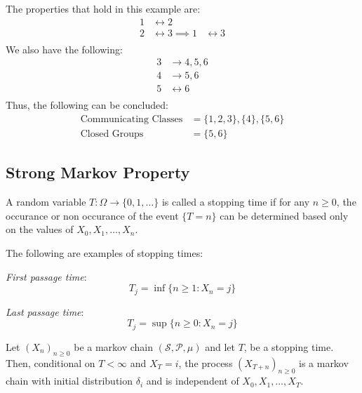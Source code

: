 \begin{example}
    The properties that hold in this example are:
    \[
        \begin{aligned}
             1 & \leftrightarrow 2 \\
             2 & \leftrightarrow 3 \implies 1 & \leftrightarrow 3 \\
        \end{aligned}
    \]
    We also have the following:
    \[
        \begin{aligned}
            3 & \to  4,5,6 \\
            4 & \to  5,6 \\
            5 & \leftrightarrow 6 \\
        \end{aligned}  
    \]
    Thus, the following can be concluded:
    \[
        \begin{aligned}
        \text{Communicating Classes} &= \{1,2,3\}, \{4\}, \{5,6\}\\
        \text{Closed Groups} &=  \{5,6\}
        \end{aligned}
    \]
\end{example}

\subsection{Strong Markov Property}
\begin{definition}
    A random variable \(T : \Omega \rightarrow \{0,1,\dots \} \) is called a stopping time if for any \(n \geq 0\),
    the occurance or non occurance of the event \(\{T = n\}\) can be determined based only on
     the values of \(X_0, X_1, \dots , X_n\).  
\end{definition}
\begin{example} The following are examples of stopping times:
    \item \emph{First passage time}:
    \[
        T_j = \inf \{n \geq 1 : X_n = j\}
    \]
    \item \emph{Last passage time}:
    \[
        T_j = \sup \{n \geq 0 : X_n = j\}
    \]
\end{example}
\begin{definition}
    Let \((X_n)_{n \geq 0}\) be a markov chain \((\mathcal{S} , \mathcal{P} , \mu )\) and let \(T\), be a stopping
    time. Then, conditional on \(T < \infty \) and \(X_T = i\), the process \((X_{T+n})_{n \geq 0}\) is a markov
    chain with initial distribution \(\delta _i\) and is independent of \(X_0, X_1, \dots , X_T\).
\end{definition}

